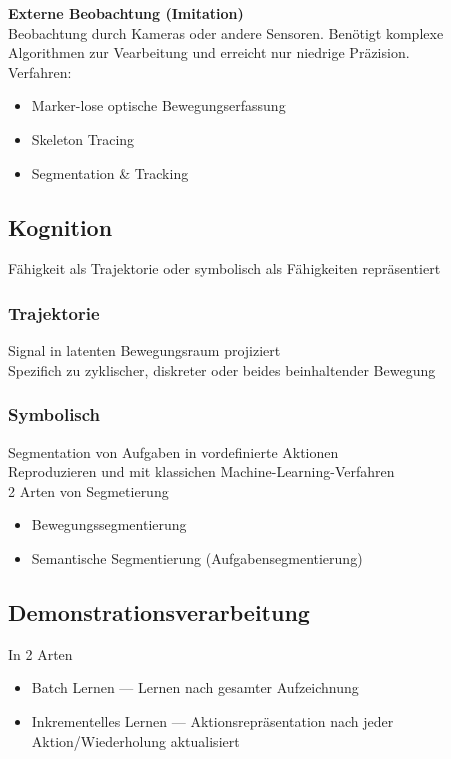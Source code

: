 \textbf{Externe Beobachtung (Imitation)}\\
Beobachtung durch Kameras oder andere Sensoren. Benötigt komplexe Algorithmen zur Vearbeitung und erreicht nur
niedrige Präzision.\\

Verfahren:
\begin{itemize}
\item Marker-lose optische Bewegungserfassung
\item Skeleton Tracing
\item Segmentation \& Tracking
\end{itemize}


\subsection{Kognition}%
\label{pdv:sub:kognition}
Fähigkeit als Trajektorie oder symbolisch als Fähigkeiten repräsentiert

\subsubsection{Trajektorie}%
\label{pdv:ssub:trajektorie}
Signal in latenten Bewegungsraum projiziert\\
Spezifich zu zyklischer, diskreter oder beides beinhaltender Bewegung

\subsubsection{Symbolisch}%
\label{pdv:ssub:symbolisch}
Segmentation von Aufgaben in vordefinierte Aktionen\\
Reproduzieren und mit klassichen Machine-Learning-Verfahren\\

2 Arten von Segmetierung
\begin{itemize}
\item Bewegungssegmentierung
\item Semantische Segmentierung (Aufgabensegmentierung)
\end{itemize}


\subsection{Demonstrationsverarbeitung}%
\label{pdv:sub:demonstrationsverarbeitung}
In 2 Arten
\begin{itemize}
\item Batch Lernen --- Lernen nach gesamter Aufzeichnung
\item Inkrementelles Lernen --- Aktionsrepräsentation nach jeder Aktion/Wiederholung aktualisiert
\end{itemize}


